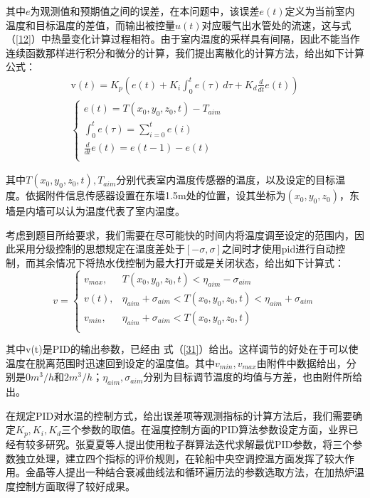 \documentclass{my_paper}
\begin{document}
其中$e$为观测值和预期值之间的误差，在本问题中，该误差$e(t)$定义为当前室内温度和目标温度的差值，而输出被控量$u(t)$对应暖气出水管处的流速，这与式（\ref{12}）中热量变化计算过程相符。由于室内温度的采样具有间隔，因此不能当作连续函数那样进行积分和微分的计算，我们提出离散化的计算方法，给出如下计算公式：
\begin{equation}
    \begin{aligned}
        {\mathrm  {v}}(t)= K_{p}({e(t)}+K_{{i}}\int _{{0}}^{{t}}{e(\tau )}\,{d\tau }+K_{{d}}{\frac  {d}{dt}}e(t))\\
        \begin{cases}
            e(t) = T(x_0,y_0,z_0,t)-T_{aim}\\
            \int _{{0}}^{{t}}{e(\tau )} = \sum_{i=0}^{t} e(i)\\
            {\frac  {d}{dt}}e(t) = e(t-1)-e(t)\\
        \end{cases}
    \end{aligned}
\label{31}
\end{equation}

其中$T(x_0,y_0,z_0,t),T_{aim}$分别代表室内温度传感器的温度，以及设定的目标温度。依据附件信息传感器设置在东墙1.5m处的位置，设其坐标为$(x_0,y_0,z_0)$，东墙是内墙可以认为温度代表了室内温度。

考虑到题目所给要求，我们需要在尽可能快的时间内将温度调至设定的范围内，因此采用分级控制的思想规定在温度差处于$[-\sigma , \sigma] $之间时才使用pid进行自动控制，而其余情况下将热水伐控制为最大打开或是关闭状态，给出如下计算式：
\begin{equation}
v = \begin{cases}
    v_{max},&T(x_0,y_0,z_0,t)<\eta_{aim}-\sigma_{aim}\\
    v(t),&\eta_{aim}+\sigma_{aim}<T(x_0,y_0,z_0,t)<\eta_{aim}+\sigma_{aim}\\
    v_{min},&\eta_{aim}+\sigma_{aim}<T(x_0,y_0,z_0,t)\\
\end{cases}
\label{32}
\end{equation}

其中v(t)是PID的输出参数，已经由 式（\ref{31}）给出。这样调节的好处在于可以使温度在脱离范围时迅速回到设定的温度值。其中$ v_{min},v_{max} $由附件中数据给出，分别是$0 m^3/h$和$ 2 m^3/h $；$\eta_{aim},\sigma_{aim}$分别为目标调节温度的均值与方差，也由附件所给出。

在规定PID对水温的控制方式，给出误差项等观测指标的计算方法后，我们需要确定$K_p,K_i,K_d$三个参数的取值。在温度控制方面的PID算法参数设定方面，业界已经有较多研究。张夏夏\cite{6}等人提出使用粒子群算法迭代求解最优PID参数，将三个参数独立处理，建立四个指标的评价规则，在轮船中央空调控温方面发挥了较大作用。金晶等人\cite{5}提出一种结合衰减曲线法和循环遍历法的参数选取方法，在加热炉温度控制方面取得了较好成果。
\end{document}
